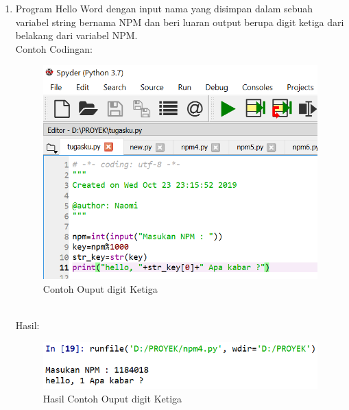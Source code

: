 \begin{enumerate}
    \newpage
    \item  Program Hello Word dengan input nama yang disimpan dalam sebuah variabel string bernama NPM dan beri luaran output berupa digit ketiga dari belakang dari variabel NPM.\\
    Contoh Codingan:
    \begin{figure}[!htbp]
    \centering
    \includegraphics[width=13cm]{gambar2/digit.png}
    \caption{Contoh Ouput digit Ketiga}
    \end{figure}\\
    Hasil:
    \begin{figure}[!htbp]
    \centering
    \includegraphics[width=14cm]{gambar2/digit1.png}
    \caption{Hasil Contoh Ouput digit Ketiga}
    \end{figure}
    

\end{enumerate}
